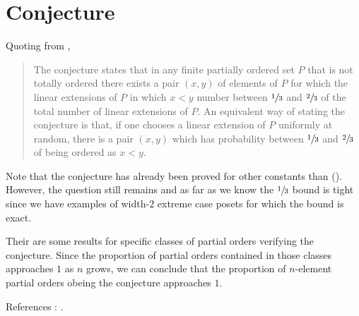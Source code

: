 \section{\onethirdtwothird Conjecture}

Quoting from \cite{wiki:linext},

\begin{quotation}
The \onethirdtwothird conjecture states that in
any finite partially ordered set $P$ that is not totally ordered there exists a
pair $(x,y)$ of elements of $P$ for which the linear extensions of $P$ in which
$x < y$ number between $\sfrac{1}{3}$ and $\sfrac{2}{3}$ of the total number of
linear extensions of $P$. An equivalent way of stating the conjecture is that,
if one chooses a linear extension of $P$ uniformly at random, there is a pair
$(x,y)$ which has probability between $\sfrac{1}{3}$ and $\sfrac{2}{3}$ of
being ordered as $x < y$.
\end{quotation}

Note that the conjecture has already been proved for other constants than
\onethirdtwothird (\cite{kahn1984balancing, linial1984information,
kahn1991balancing, brightwell1995balancing, brightwell1999balanced}).
However, the question still remains and as far as we
know the $\sfrac{1}{3}$ bound is tight since we have examples of width-$2$
extreme case posets for which the bound is exact.


Their are some results for specific classes of partial orders verifying the
conjecture. Since the proportion of partial orders contained in those classes
approaches $1$ as $n$ grows, we can conclude that the proportion of $n$-element
partial orders obeing the \onethirdtwothird conjecture approaches $1$.


References : \cite{kral2013new,zaguia20111,peczarski2006gold,peczarski2008gold}.
